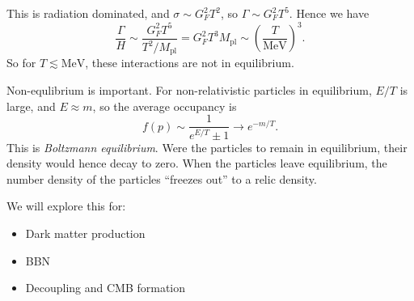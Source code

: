 \documentclass{jknotes}
\begin{document}
\begin{itemize}
\begin{figure}[H]
        \end{figure}
        This is radiation dominated, and \(\sigma \sim G_F^2T^2\), so \(\Gamma \sim G_F^2T^5\). Hence we have 
        \begin{equation}
            \frac\Gamma{H} \sim \frac{G_F^2 T^5}{T^2/M_{\text{pl}}} = G_F^2T^3M_{\text{pl}} \sim \left(\frac{T}{\si{\mega\eV}}\right)^3.
        \end{equation}
        So for \(T\lesssim\si{\mega\eV}\), these interactions are not in equilibrium.
\end{itemize}

Non-equlibrium is important. For non-relativistic particles in equilibrium, \(E/T\) is large, and \(E \approx m\), so the average occupancy is
\begin{equation}
    f(p) \sim \frac1{e^{E/T}\pm 1} \to e^{-m/T}.
\end{equation}
This is \emph{Boltzmann equilibrium}. Were the particles to remain in equilibrium, their density would hence decay to zero. When the particles leave equilibrium, the number density of the particles ``freezes out'' to a relic density.
\begin{figure}[H]
    \centering
\end{figure}

We will explore this for:
\begin{itemize}
    \item Dark matter production
    \item BBN
    \item Decoupling and CMB formation
\end{itemize}
\end{document}
